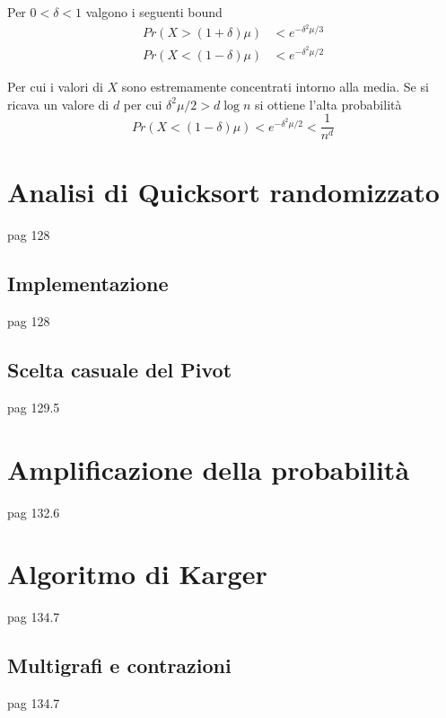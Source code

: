 \begin{corollario}
    Per $
    0 < \delta < 1
    $ valgono i seguenti bound
    \begin{align*}
        Pr \left( 
            X > \left( 1 + \delta \right) \mu
        \right)
        &
        <
        e^{
            -\delta^2 \mu / 3
        }
        \\
        Pr \left( 
            X < \left( 1 - \delta \right) \mu
        \right)
        &
        <
        e^{
            -\delta^2 \mu / 2
        }
    \end{align*}
\end{corollario}
Per cui i valori di $X$ sono estremamente concentrati intorno alla media.
Se si ricava un valore di $d$ per cui $
\delta^2 \mu / 2
> 
d \log n
$ si ottiene l'alta probabilità
\begin{equation*}
    Pr \left( 
        X < \left( 1 - \delta \right) \mu
    \right)
    <
    e^{
        -\delta^2 \mu / 2
    }
    <
    \frac{1}{n^d}
\end{equation*}




\section{Analisi di Quicksort randomizzato}
pag 128

\subsection{Implementazione}
pag 128

\subsection{Scelta casuale del Pivot}
pag 129.5

\section{Amplificazione della probabilità}
pag 132.6

\section{Algoritmo di Karger}
pag 134.7

\subsection{Multigrafi e contrazioni}
pag 134.7

